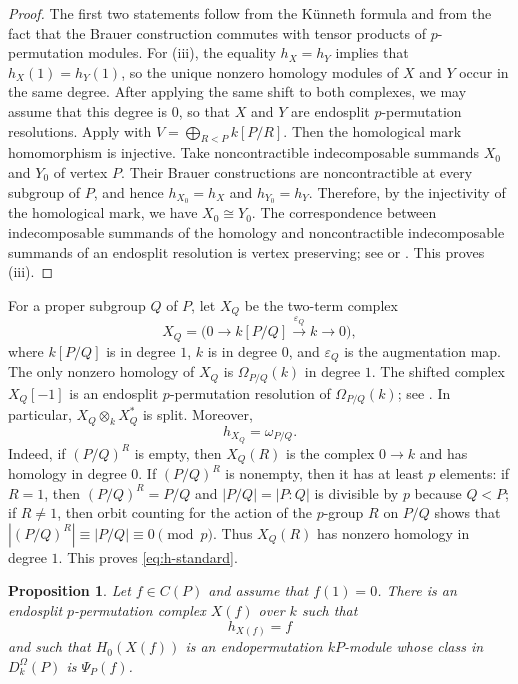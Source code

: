 \documentclass[preprint,12pt,3p]{elsarticle}
\newtheorem{proposition}[theorem]{Proposition}%
\begin{document}
\begin{proof}
The first two statements follow from the K\"unneth formula and from the fact that the Brauer construction commutes with tensor products of $p$-permutation modules. For (iii), the equality $h_X=h_Y$ implies that $h_X(1)=h_Y(1)$, so the unique nonzero homology modules of $X$ and $Y$ occur in the same degree. After applying the same shift to both complexes, we may assume that this degree is $0$, so that $X$ and $Y$ are endosplit $p$-permutation resolutions. Apply \cite[Theorem 3.13]{Mil26} with $V=\bigoplus_{R<P}k[P/R]$. Then the homological mark homomorphism is injective. Take noncontractible indecomposable summands $X_0$ and $Y_0$ of vertex $P$. Their Brauer constructions are noncontractible at every subgroup of $P$, and hence $h_{X_0}=h_X$ and $h_{Y_0}=h_Y$. Therefore, by the injectivity of the homological mark, we have $X_0\cong Y_0$. The correspondence between indecomposable summands of the homology and noncontractible indecomposable summands of an endosplit resolution is vertex preserving; see \cite[Theorem 7.11.2]{Lin18b} or \cite[Proposition 3.4]{Mil26}. This proves (iii).
\end{proof}

For a proper subgroup $Q$ of $P$, let $X_Q$ be the two-term complex
$$
 X_Q=\big(0\longrightarrow k[P/Q]
 \stackrel{\varepsilon_Q}{\longrightarrow}k\longrightarrow0\big),
$$
where $k[P/Q]$ is in degree $1$, $k$ is in degree $0$, and $\varepsilon_Q$ is the augmentation map. The only nonzero homology of $X_Q$ is $\Omega_{P/Q}(k)$ in degree $1$. The shifted complex $X_Q[-1]$ is an endosplit $p$-permutation resolution of $\Omega_{P/Q}(k)$; see \cite[\S7]{Rickard}. In particular, $X_Q\otimes_k X_Q^*$ is split. Moreover,
\begin{equation}\label{eq:h-standard}
 h_{X_Q}=\omega_{P/Q}.
\end{equation}
Indeed, if $(P/Q)^R$ is empty, then $X_Q(R)$ is the complex $0\to k$ and has homology in degree $0$. If $(P/Q)^R$ is nonempty, then it has at least $p$ elements: if $R=1$, then $(P/Q)^R=P/Q$ and $|P/Q|=|P:Q|$ is divisible by $p$ because $Q<P$; if $R\neq1$, then orbit counting for the action of the $p$-group $R$ on $P/Q$ shows that $|(P/Q)^R|\equiv |P/Q|\equiv0\pmod p$. Thus $X_Q(R)$ has nonzero homology in degree $1$. This proves \eqref{eq:h-standard}.

\begin{proposition}\label{prop:realise-f}
Let $f\in C(P)$ and assume that $f(1)=0$. There is an endosplit $p$-permutation complex $X(f)$ over $k$ such that
$$
 h_{X(f)}=f
$$
and such that $H_0(X(f))$ is an endopermutation $kP$-module whose class in $D_k^\Omega(P)$ is $\Psi_P(f)$.
\end{proposition}
\end{document}
